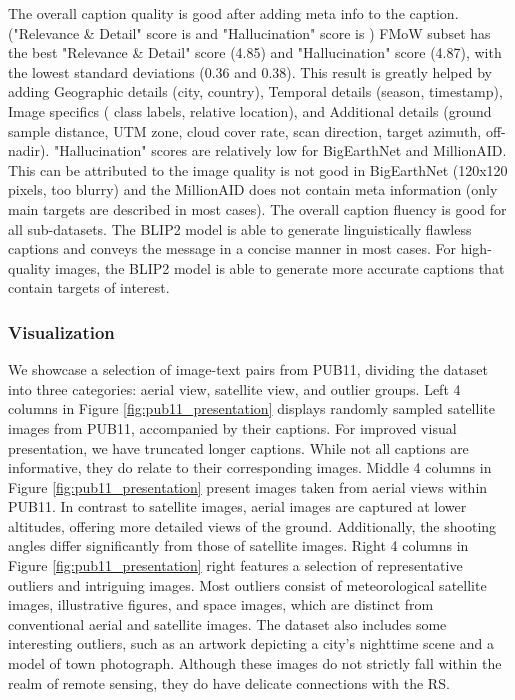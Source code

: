 \documentclass[journal]{IEEEtran}
\begin{document}
The overall caption quality is good after adding meta info to the caption. ("Relevance \& Detail" score is  and "Hallucination" score is )
FMoW subset has the best "Relevance \& Detail" score (4.85) and "Hallucination" score (4.87), with the lowest standard deviations (0.36 and 0.38). This result is greatly helped by adding Geographic details (city, country), Temporal details (season, timestamp), Image specifics ( class labels, relative location), and Additional details (ground sample distance, UTM zone, cloud cover rate, scan direction, target azimuth, off-nadir).
"Hallucination" scores are relatively low for BigEarthNet and MillionAID. This can be attributed to the image quality is not good in BigEarthNet (120x120 pixels, too blurry) and the MillionAID does not contain meta information (only main targets are described in most cases).
The overall caption fluency is good for all sub-datasets. The BLIP2 model is able to generate linguistically flawless captions and conveys the message in a concise manner in most cases.
For high-quality images, the BLIP2 model is able to generate more accurate captions that contain targets of interest.

\subsubsection{Visualization}
\label{appendix:visualization}
We showcase a selection of image-text pairs from PUB11, dividing the dataset into three categories: aerial view, satellite view, and outlier groups. Left 4 columns in Figure \ref{fig:pub11_presentation} displays randomly sampled satellite images from PUB11, accompanied by their captions. For improved visual presentation, we have truncated longer captions. While not all captions are informative, they do relate to their corresponding images. Middle 4 columns in Figure \ref{fig:pub11_presentation} present images taken from aerial views within PUB11. In contrast to satellite images, aerial images are captured at lower altitudes, offering more detailed views of the ground. Additionally, the shooting angles differ significantly from those of satellite images. Right 4 columns in Figure \ref{fig:pub11_presentation} right features a selection of representative outliers and intriguing images. Most outliers consist of meteorological satellite images, illustrative figures, and space images, which are distinct from conventional aerial and satellite images. The dataset also includes some interesting outliers, such as an artwork depicting a city's nighttime scene and a model of town photograph. Although these images do not strictly fall within the realm of remote sensing, they do have delicate connections with the RS.
\end{document}
